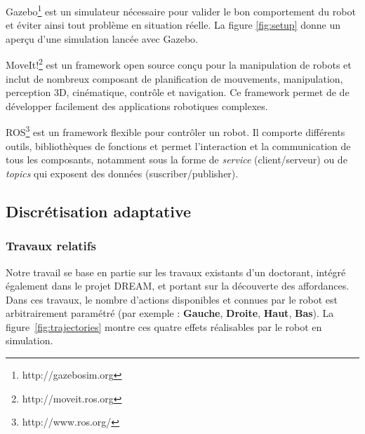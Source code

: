 \documentclass[draft]{llncs}
\begin{document}
Gazebo\footnote{http://gazebosim.org} est un simulateur nécessaire pour valider le bon comportement du robot et éviter ainsi tout problème en situation réelle.
La figure \ref{fig:setup} donne un aperçu d'une simulation lancée avec Gazebo.

MoveIt!\footnote{http://moveit.ros.org} est un framework open source conçu pour la manipulation de robots et inclut de nombreux composant de planification de mouvements, manipulation, perception 3D, cinématique, contrôle et navigation.
Ce framework permet de de développer facilement des applications robotiques complexes.

ROS\footnote{http://www.ros.org/} est un framework flexible pour contrôler un robot.
Il comporte différents outils, bibliothèques de fonctions et permet l'interaction et la communication de tous les composants, notamment sous la forme de \textit{service} (client/serveur) ou de \textit{topics} qui exposent des données (suscriber/publisher).






\subsection{Discrétisation adaptative}


\subsubsection{Travaux relatifs}

Notre travail se base en partie sur les travaux existants d'un doctorant, intégré également dans le projet DREAM, et portant sur la découverte des affordances.
Dans ces travaux, le nombre d'actions disponibles et connues par le robot est arbitrairement paramétré (par exemple : \textbf{Gauche}, \textbf{Droite}, \textbf{Haut}, \textbf{Bas}). La figure~\ref{fig:trajectories} montre ces quatre effets réalisables par le robot en simulation.

\end{document}
